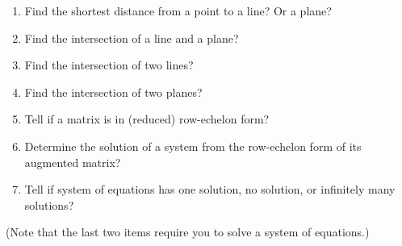 \documentclass[12pt]{article}
\begin{document}
\begin{enumerate}
 \item Find the shortest distance from a point to a line? Or a plane?
 \item Find the intersection of a line and a plane?
 \item Find the intersection of two lines?
 \item Find the intersection of two planes?
 \item Tell if a matrix is in (reduced) row-echelon form?
 \item Determine the solution of a system from the row-echelon form of its augmented matrix?
 \item Tell if system of equations has one solution, no solution, or infinitely many solutions?
\end{enumerate}
(Note that the last two items require you to solve a system of equations.)
\end{document}
